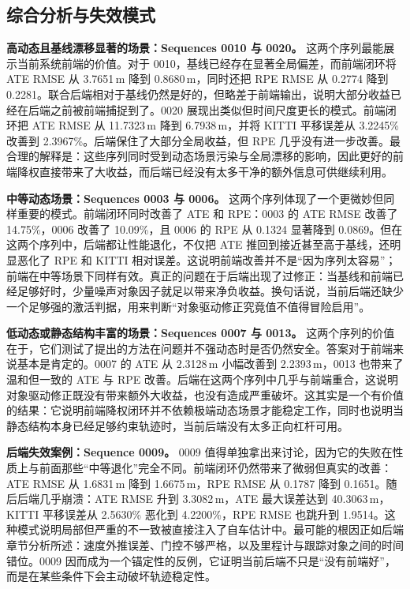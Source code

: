 \documentclass[utf8, a4paper, 12pt]{ctexart}
\begin{document}
\subsection{综合分析与失效模式}
\textbf{高动态且基线漂移显著的场景：Sequences 0010 与 0020。} 这两个序列最能展示当前系统前端的价值。对于 0010，基线已经存在显著全局偏差，而前端闭环将 ATE RMSE 从 3.7651\,m 降到 0.8680\,m，同时还把 RPE RMSE 从 0.2774 降到 0.2281。联合后端相对于基线仍然是好的，但略差于前端输出，说明大部分收益已经在后端之前被前端捕捉到了。0020 展现出类似但时间尺度更长的模式。前端闭环把 ATE RMSE 从 11.7323\,m 降到 6.7938\,m，并将 KITTI 平移误差从 3.2245\% 改善到 2.3967\%。后端保住了大部分全局收益，但 RPE 几乎没有进一步改善。最合理的解释是：这些序列同时受到动态场景污染与全局漂移的影响，因此更好的前端降权直接带来了大收益，而后端已经没有太多干净的额外信息可供继续利用。

\textbf{中等动态场景：Sequences 0003 与 0006。} 这两个序列体现了一个更微妙但同样重要的模式。前端闭环同时改善了 ATE 和 RPE：0003 的 ATE RMSE 改善了 14.75\%，0006 改善了 10.09\%，且 0006 的 RPE 从 0.1324 显著降到 0.0869。但在这两个序列中，后端都让性能退化，不仅把 ATE 推回到接近甚至高于基线，还明显恶化了 RPE 和 KITTI 相对误差。这说明前端改善并不是“因为序列太容易”；前端在中等场景下同样有效。真正的问题在于后端出现了过修正：当基线和前端已经足够好时，少量噪声对象因子就足以带来净负收益。换句话说，当前后端还缺少一个足够强的激活判据，用来判断“对象驱动修正究竟值不值得冒险启用”。

\textbf{低动态或静态结构丰富的场景：Sequences 0007 与 0013。} 这两个序列的价值在于，它们测试了提出的方法在问题并不强动态时是否仍然安全。答案对于前端来说基本是肯定的。0007 的 ATE 从 2.3128\,m 小幅改善到 2.2393\,m，0013 也带来了温和但一致的 ATE 与 RPE 改善。后端在这两个序列中几乎与前端重合，这说明对象驱动修正既没有带来额外大收益，也没有造成严重破坏。这其实是一个有价值的结果：它说明前端降权闭环并不依赖极端动态场景才能稳定工作，同时也说明当静态结构本身已经足够约束轨迹时，当前后端没有太多正向杠杆可用。

\textbf{后端失效案例：Sequence 0009。} 0009 值得单独拿出来讨论，因为它的失败在性质上与前面那些“中等退化”完全不同。前端闭环仍然带来了微弱但真实的改善：ATE RMSE 从 1.6831\,m 降到 1.6675\,m，RPE RMSE 从 0.1787 降到 0.1651。随后后端几乎崩溃：ATE RMSE 升到 3.3082\,m，ATE 最大误差达到 40.3063\,m，KITTI 平移误差从 2.5630\% 恶化到 4.2200\%，RPE RMSE 也跳升到 1.9514。这种模式说明局部但严重的不一致被直接注入了自车估计中。最可能的根因正如后端章节分析所述：速度外推误差、门控不够严格，以及里程计与跟踪对象之间的时间错位。0009 因而成为一个锚定性的反例，它证明当前后端不只是“没有前端好”，而是在某些条件下会主动破坏轨迹稳定性。
\end{document}
